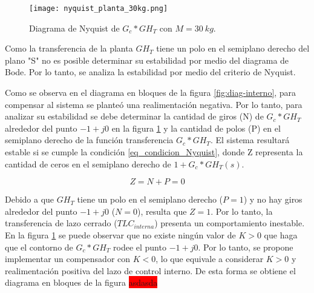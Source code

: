 \begin{figure}[H]
	\centering
	\texttt{[image: nyquist\_planta\_30kg.png]}
	\caption{Diagrama de Nyquist de $G_c*GH_T$ con $M=30\:kg$.}
	\label{fig:Diag_Nyquist_lazo_abierto_30kg}
\end{figure}



Como la transferencia de la planta $GH_T$ tiene un polo en el semiplano derecho del plano "S" no es posible determinar su estabilidad por medio del diagrama de Bode. Por lo tanto, se analiza la estabilidad por medio del criterio de Nyquist.

Como se observa en el diagrama en bloques de la figura \ref{fig:diag-interno}, para compensar al sistema se planteó una realimentación negativa. Por lo tanto, para analizar su estabilidad  se debe determinar la cantidad de giros (N) de $G_c*GH_T$ alrededor del punto $-1+j0$ en la figura \ref{fig:Diag_Nyquist_lazo_abierto_30kg} y la cantidad de polos (P) en el semiplano derecho de la función transferencia $G_c*GH_T$. El sistema resultará estable si se cumple la condición \ref{eq_condicion_Nyquist}, donde Z representa la cantidad de ceros en el semiplano derecho de $1+G_c*GH_T(s)$.

\begin{equation}\label{eq_condicion_Nyquist}
	Z=N+P=0
\end{equation}


Debido a que $GH_T$ tiene un polo en el semiplano derecho ($P=1$) y no hay giros alrededor del punto $-1+j0$ ($N=0$), resulta que $Z=1$. Por lo tanto, la transferencia de lazo cerrado ($TLC_{interna}$) presenta un comportamiento inestable. En la figura \ref{fig:Diag_Nyquist_lazo_abierto_30kg} se puede observar que no existe ningún valor de $K>0$ que haga que el contorno de $G_c*GH_T$ rodee el punto $-1+j0$. Por lo tanto, se propone implementar un compensador con $K<0$, lo que equivale a considerar $K>0$ y realimentación positiva del lazo de control interno. De esta forma se obtiene el diagrama en bloques de la figura \colorbox{red}{asdasda}

